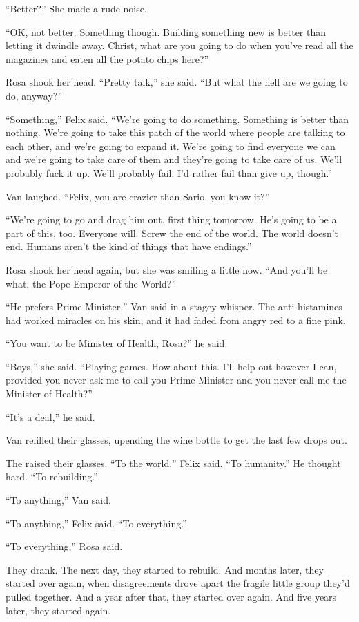 “Better?” She made a rude noise.

“OK, not better. Something though. Building something new is better
than letting it dwindle away. Christ, what are you going to do when
you’ve read all the magazines and eaten all the potato chips
here?”

Rosa shook her head. “Pretty talk,” she said. “But what the hell
are we going to do, anyway?”

“Something,” Felix said. “We’re going to do something. Something is
better than nothing. We’re going to take this patch of the world
where people are talking to each other, and we’re going to expand
it. We’re going to find everyone we can and we’re going to take
care of them and they’re going to take care of us. We’ll probably
fuck it up. We’ll probably fail. I’d rather fail than give up,
though.”

Van laughed. “Felix, you are crazier than Sario, you know it?”

“We’re going to go and drag him out, first thing tomorrow. He’s
going to be a part of this, too. Everyone will. Screw the end of
the world. The world doesn’t end. Humans aren’t the kind of things
that have endings.”

Rosa shook her head again, but she was smiling a little now. “And
you’ll be what, the Pope-Emperor of the World?”

“He prefers Prime Minister,” Van said in a stagey whisper. The
anti-histamines had worked miracles on his skin, and it had faded
from angry red to a fine pink.

“You want to be Minister of Health, Rosa?” he said.

“Boys,” she said. “Playing games. How about this. I’ll help out
however I can, provided you never ask me to call you Prime Minister
and you never call me the Minister of Health?”

“It’s a deal,” he said.

Van refilled their glasses, upending the wine bottle to get the
last few drops out.

The raised their glasses. “To the world,” Felix said. “To
humanity.” He thought hard. “To rebuilding.”

“To anything,” Van said.

“To anything,” Felix said. “To everything.”

“To everything,” Rosa said.

They drank. The next day, they started to rebuild. And months
later, they started over again, when disagreements drove apart the
fragile little group they’d pulled together. And a year after that,
they started over again. And five years later, they started again.

